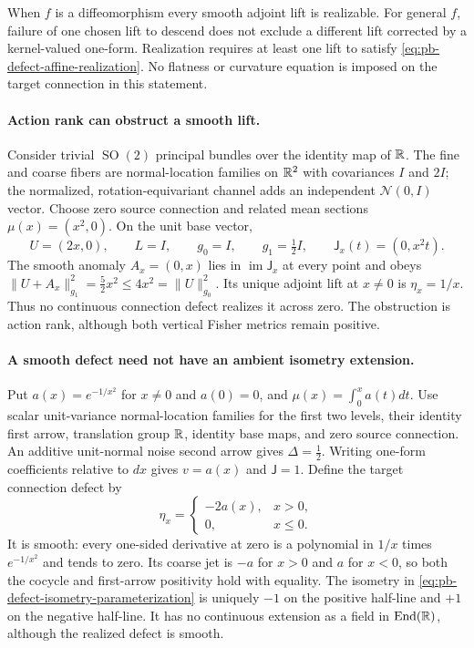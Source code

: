 When $f$ is a diffeomorphism every smooth adjoint lift is realizable.
For general $f$, failure of one chosen lift to descend does not
exclude a different lift corrected by a kernel-valued one-form.
Realization requires at least one lift to satisfy
\eqref{eq:pb-defect-affine-realization}. No flatness or curvature
equation is imposed on the target connection in this statement.

\paragraph{Action rank can obstruct a smooth lift.}
Consider trivial $\operatorname{SO}(2)$ principal bundles over the
identity map of $\mathbb R$. The fine and coarse fibers are normal-location
families on $\mathbb R^2$ with covariances $I$ and $2I$; the normalized,
rotation-equivariant channel adds an independent
$\mathcal N(0,I)$ vector. Choose zero source connection and related
mean sections $\mu(x)=(x^2,0)$. On the unit base vector,
\begin{equation}
U=(2x,0),\qquad L=I,\qquad
g_0=I,\qquad g_1=\tfrac12 I,\qquad
\mathsf J_x(t)=(0,x^2t).
\label{eq:pb-defect-action-rank-example}
\end{equation}
The smooth anomaly $A_x=(0,x)$ lies in $\operatorname{im}\mathsf J_x$
at every point and obeys
$\|U+A_x\|_{g_1}^2=\tfrac52x^2\leq4x^2=\|U\|_{g_0}^2$.
Its unique adjoint lift at $x\ne0$ is $\eta_x=1/x$.
Thus no continuous connection defect realizes it across zero.
The obstruction is action rank, although both vertical Fisher
metrics remain positive. 

\paragraph{A smooth defect need not have an ambient isometry extension.}
Put $a(x)=e^{-1/x^2}$ for $x\ne0$ and $a(0)=0$, and
$\mu(x)=\int_0^x a(t)dt$. Use scalar unit-variance normal-location
families for the first two levels, their identity first arrow,
translation group $\mathbb R$, identity base maps, and zero source
connection. An additive unit-normal noise second arrow gives
$\Delta=\tfrac12$. Writing one-form coefficients relative to $dx$ gives $v=a(x)$
and $\mathsf J=1$. Define the target
connection defect by
\begin{equation}
\eta_x=
\begin{cases}
-2a(x),&x>0,\\
0,&x\leq0.
\end{cases}
\label{eq:pb-defect-flat-jet-example}
\end{equation}
It is smooth: every one-sided derivative at zero is a polynomial in
$1/x$ times $e^{-1/x^2}$ and tends to zero. Its coarse jet is $-a$
for $x>0$ and $a$ for $x<0$, so both the cocycle and first-arrow
positivity hold with equality. The isometry in
\eqref{eq:pb-defect-isometry-parameterization} is uniquely $-1$ on
the positive half-line and $+1$ on the negative half-line.
It has no continuous extension as a field in
$\operatorname{End}(\mathbb R)$, although the realized defect is smooth.

